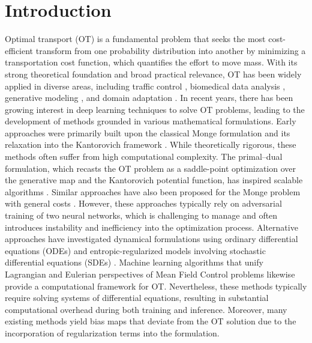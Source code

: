\documentclass{article} %
\theoremstyle{plain}
\theoremstyle{definition}
\theoremstyle{remark}
\begin{document}
\section{Introduction}\vspace{-0.2em}
Optimal transport (OT) is a fundamental problem that seeks the most cost-efficient transform from one probability distribution into another by minimizing a transportation cost function, which quantifies the effort to move mass. With its strong theoretical foundation and broad practical relevance, OT has been widely applied in diverse areas, including traffic control \citep{carlier2008optimal,danila2006optimal, barthelemy2006optimal}, biomedical data analysis \citep{schiebinger2019optimal, koshizuka2022neural, bunne2023learning}, generative modeling \citep{wang2021deep,onken2021ot,zhang2023mean, liu2019wasserstein}, and domain adaptation \citep{courty2016optimal, courty2017joint, damodaran2018deepjdot, balaji2020robust}.
In recent years, there has been growing interest in deep learning techniques to solve OT problems, leading to the development of methods grounded in various mathematical formulations. Early approaches were primarily built upon the classical Monge formulation \citep{lu2020large, xie2019scalable} and its relaxation into the Kantorovich framework \citep{makkuva2020optimal}. While theoretically rigorous, these methods often suffer from high computational complexity. The primal–dual formulation, which recasts the OT problem as a saddle-point optimization over the generative map and the Kantorovich potential function, has inspired scalable algorithms \citep{liu2019wasserstein, taghvaei20192, korotin2021neural, liu2021learning, choi2024improving}. Similar approaches have also been proposed for the Monge problem with general costs \citep{asadulaev2022neural, fan2023neural}. However, these approaches typically rely on adversarial training of two neural networks, which is challenging to manage and often introduces instability and inefficiency into the optimization process. Alternative approaches have investigated dynamical formulations using ordinary differential equations (ODEs) \citep{yang2020potential,onken2021ot, tong2020trajectorynet, huguet2022manifold} and entropic-regularized models involving stochastic differential equations (SDEs)
\citep{genevay2016stochastic, seguy2017large, daniels2021score, gushchin2023entropic, zhou2024score}. Machine learning algorithms that unify Lagrangian and Eulerian perspectives of Mean Field Control problems \cite{ruthotto2020machine, lin2021alternating,zhao2025variational} likewise provide a computational framework for OT. Nevertheless, these methods typically require solving systems of differential equations, resulting in substantial computational overhead during both training and inference. Moreover, many existing methods yield bias maps that deviate from the OT solution due to the incorporation of regularization terms into the formulation. %
\end{document}
